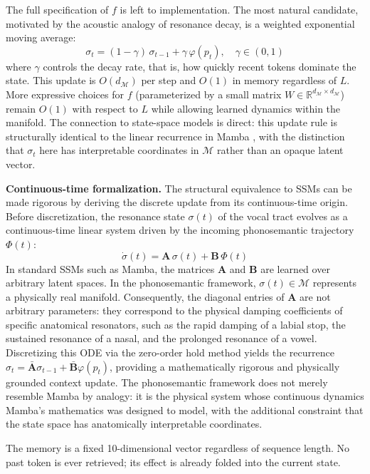 \documentclass[12pt]{article}
\begin{document}
The full specification of $f$ is left to implementation. The most natural candidate, motivated by the acoustic analogy of resonance decay, is a weighted exponential moving average:
\[
\sigma_t = (1 - \gamma)\,\sigma_{t-1} + \gamma\,\varphi(p_t), \quad \gamma \in (0,1)
\]
where $\gamma$ controls the decay rate, that is, how quickly recent tokens dominate the state. This update is $O(d_\mathcal{M})$ per step and $O(1)$ in memory regardless of $L$. More expressive choices for $f$ (parameterized by a small matrix $W \in \mathbb{R}^{d_\mathcal{M} \times d_\mathcal{M}}$) remain $O(1)$ with respect to $L$ while allowing learned dynamics within the manifold. The connection to state-space models is direct: this update rule is structurally identical to the linear recurrence in Mamba \cite{gu2022mamba}, with the distinction that $\sigma_t$ here has interpretable coordinates in $\mathcal{M}$ rather than an opaque latent vector.

\textbf{Continuous-time formalization.} The structural equivalence to SSMs can be made rigorous by deriving the discrete update from its continuous-time origin. Before discretization, the resonance state $\sigma(t)$ of the vocal tract evolves as a continuous-time linear system driven by the incoming phonosemantic trajectory $\Phi(t)$:
\[
\dot{\sigma}(t) = \mathbf{A}\,\sigma(t) + \mathbf{B}\,\Phi(t)
\]
In standard SSMs such as Mamba, the matrices $\mathbf{A}$ and $\mathbf{B}$ are learned over arbitrary latent spaces. In the phonosemantic framework, $\sigma(t) \in \mathcal{M}$ represents a physically real manifold. Consequently, the diagonal entries of $\mathbf{A}$ are not arbitrary parameters: they correspond to the physical damping coefficients of specific anatomical resonators, such as the rapid damping of a labial stop, the sustained resonance of a nasal, and the prolonged resonance of a vowel. Discretizing this ODE via the zero-order hold method yields the recurrence $\sigma_t = \bar{\mathbf{A}}\sigma_{t-1} + \bar{\mathbf{B}}\varphi(p_t)$, providing a mathematically rigorous and physically grounded context update. The phonosemantic framework does not merely resemble Mamba by analogy: it is the physical system whose continuous dynamics Mamba's mathematics was designed to model, with the additional constraint that the state space has anatomically interpretable coordinates.

The memory is a fixed 10-dimensional vector regardless of sequence length. No past token is ever retrieved; its effect is already folded into the current state.
\end{document}
